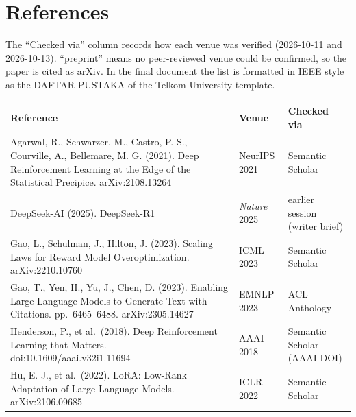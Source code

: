 \section{References}\label{references}

The ``Checked via'' column records how each venue was verified
(2026-10-11 and 2026-10-13). ``preprint'' means no peer-reviewed venue
could be confirmed, so the paper is cited as arXiv. In the final
document the list is formatted in IEEE style as the DAFTAR PUSTAKA of
the Telkom University template.

{\def\LTcaptype{none} %
\begin{longtable}[]{@{}
  >{\raggedright\arraybackslash}p{}
  >{\raggedright\arraybackslash}p{}
  >{\raggedright\arraybackslash}p{}@{}}
\toprule\noalign{}
\begin{minipage}[b]{\linewidth}\raggedright
Reference
\end{minipage} & \begin{minipage}[b]{\linewidth}\raggedright
Venue
\end{minipage} & \begin{minipage}[b]{\linewidth}\raggedright
Checked via
\end{minipage} \\
\midrule\noalign{}
\endhead
\bottomrule\noalign{}
\endlastfoot
Agarwal, R., Schwarzer, M., Castro, P. S., Courville, A., Bellemare, M.
G. (2021). Deep Reinforcement Learning at the Edge of the Statistical
Precipice. arXiv:2108.13264 & NeurIPS 2021 & Semantic Scholar \\
DeepSeek-AI (2025). DeepSeek-R1 & \emph{Nature} 2025 & earlier session
(writer brief) \\
Gao, L., Schulman, J., Hilton, J. (2023). Scaling Laws for Reward Model
Overoptimization. arXiv:2210.10760 & ICML 2023 & Semantic Scholar \\
Gao, T., Yen, H., Yu, J., Chen, D. (2023). Enabling Large Language
Models to Generate Text with Citations. pp.~6465--6488. arXiv:2305.14627
& EMNLP 2023 & ACL Anthology \\
Henderson, P., et al.~(2018). Deep Reinforcement Learning that Matters.
doi:10.1609/aaai.v32i1.11694 & AAAI 2018 & Semantic Scholar (AAAI
DOI) \\
Hu, E. J., et al.~(2022). LoRA: Low-Rank Adaptation of Large Language
Models. arXiv:2106.09685 & ICLR 2022 & Semantic Scholar \\

\end{longtable}}
